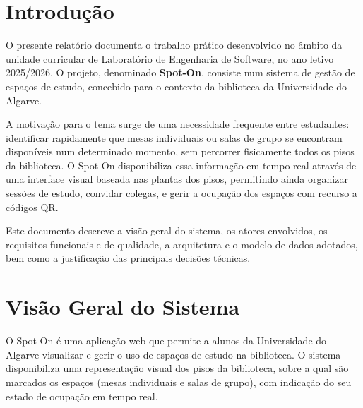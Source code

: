 \documentclass[11pt,a4paper]{article}
\begin{document}
\tableofcontents
\thispagestyle{fancy}
\newpage

\section{Introdução}

O presente relatório documenta o trabalho prático desenvolvido no âmbito da
unidade curricular de Laboratório de Engenharia de Software, no ano letivo
2025/2026. O projeto, denominado \textbf{Spot-On}, consiste num sistema de
gestão de espaços de estudo, concebido para o contexto da biblioteca da
Universidade do Algarve.

A motivação para o tema surge de uma necessidade frequente entre estudantes:
identificar rapidamente que mesas individuais ou salas de grupo se encontram
disponíveis num determinado momento, sem percorrer fisicamente todos os pisos
da biblioteca. O Spot-On disponibiliza essa informação em tempo real através
de uma interface visual baseada nas plantas dos pisos, permitindo ainda
organizar sessões de estudo, convidar colegas, e gerir a ocupação dos espaços
com recurso a códigos QR.

Este documento descreve a visão geral do sistema, os atores envolvidos, os
requisitos funcionais e de qualidade, a arquitetura e o modelo de dados
adotados, bem como a justificação das principais decisões técnicas.

\section{Visão Geral do Sistema}\label{sec:overview}

O Spot-On é uma aplicação web que permite a alunos da Universidade do Algarve
visualizar e gerir o uso de espaços de estudo na biblioteca. O sistema
disponibiliza uma representação visual dos pisos da biblioteca, sobre a qual
são marcados os espaços (mesas individuais e salas de grupo), com indicação do
seu estado de ocupação em tempo real.
\end{document}

